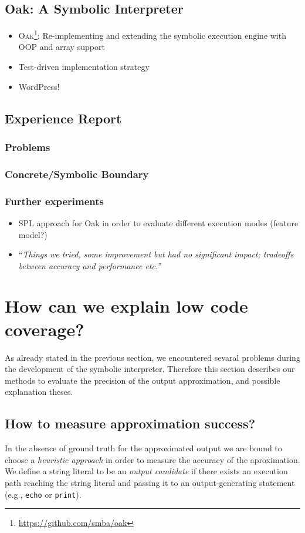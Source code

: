 \documentclass{sig-alternate-05-2015}
\begin{document}
\subsection{Oak: A Symbolic Interpreter}
\begin{itemize}
  \item \textsc{Oak}\footnote{\url{https://github.com/smba/oak}}:
  Re-implementing and extending the symbolic execution engine with OOP and array support
  \item Test-driven implementation strategy 
  \item WordPress!
\end{itemize}
\subsection{Experience Report}
\subsubsection{Problems}
\subsubsection{Concrete/Symbolic Boundary}
\subsubsection{Further experiments}
\begin{itemize}
  \item SPL approach for Oak in order to evaluate different execution modes
  (feature model?)
  \item ``\emph{Things we tried, some improvement but had no significant impact;
  tradeoffs between accuracy and performance etc.}''
\end{itemize}

\section{How can we explain low code coverage?}
As already stated in the previous section, we encountered sevaral problems
during the development of the symbolic interpreter. Therefore this section
describes our methods to evaluate the precision of the output approximation, and
possible explanation theses.

\subsection{How to measure approximation success?} \label{heuristic}
In the absence of ground truth for the approximated output we
are bound to choose a \emph{heuristic approach} in order to measure the accuracy
of the aproximation. We define a string literal to be an \emph{output candidate} if there exists an
execution path reaching the string literal and passing it to an 
output-generating statement (e.g., \texttt{echo} or \texttt{print}).
\end{document}
